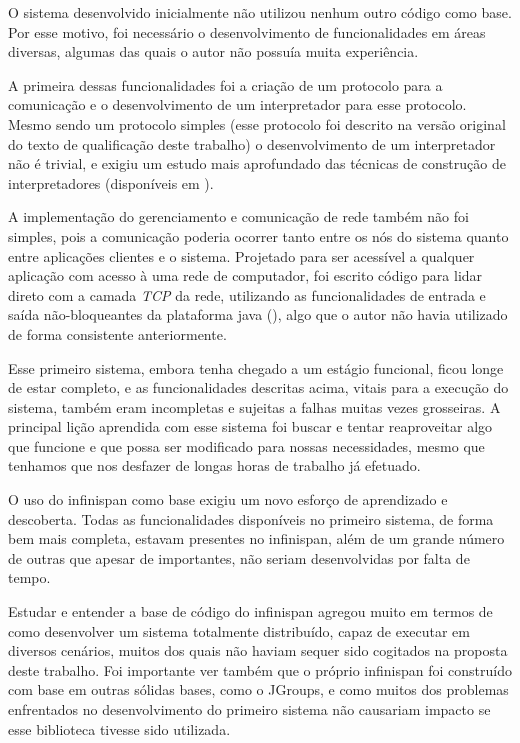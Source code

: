 \documentclass[11pt,twoside,a4paper]{book}
\begin{document}
O sistema desenvolvido inicialmente não utilizou nenhum outro código como base. Por esse motivo, foi necessário o desenvolvimento de funcionalidades em áreas diversas, algumas das quais o autor não possuía muita experiência.

A primeira dessas funcionalidades foi a criação de um protocolo para a comunicação e o desenvolvimento de um interpretador para esse protocolo. Mesmo sendo um protocolo simples (esse protocolo foi descrito na versão original do texto de qualificação deste trabalho) o desenvolvimento de um interpretador não é trivial, e exigiu um estudo mais aprofundado das técnicas de construção de interpretadores (disponíveis em \cite{compilers}).

A implementação do gerenciamento e comunicação de rede também não foi simples, pois a comunicação poderia ocorrer tanto entre os nós do sistema quanto entre aplicações clientes e o sistema. Projetado para ser acessível a qualquer aplicação com acesso à uma rede de computador, foi escrito código para lidar direto com a camada \emph{TCP} da rede, utilizando as funcionalidades de entrada e saída não-bloqueantes da plataforma java (\cite{nio}), algo que o autor não havia utilizado de forma consistente anteriormente.

Esse primeiro sistema, embora tenha chegado a um estágio funcional, ficou longe de estar completo, e as funcionalidades descritas acima, vitais para a execução do sistema, também eram incompletas e sujeitas a falhas muitas vezes grosseiras. A principal lição aprendida com esse sistema foi buscar e tentar reaproveitar algo que funcione e que possa ser modificado para nossas necessidades, mesmo que tenhamos que nos desfazer de longas horas de trabalho já efetuado.

O uso do infinispan como base exigiu um novo esforço de aprendizado e descoberta. Todas as funcionalidades disponíveis no primeiro sistema, de forma bem mais completa, estavam presentes no infinispan, além de um grande número de outras que apesar de importantes, não seriam desenvolvidas por falta de tempo.

Estudar e entender a base de código do infinispan agregou muito em termos de como desenvolver um sistema totalmente distribuído, capaz de executar em diversos cenários, muitos dos quais não haviam sequer sido cogitados na proposta deste trabalho. Foi importante ver também que o próprio infinispan foi construído com base em outras sólidas bases, como o JGroups, e como muitos dos problemas enfrentados no desenvolvimento do primeiro sistema não causariam impacto se esse biblioteca tivesse sido utilizada.
\end{document}
